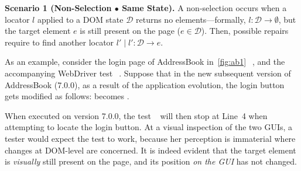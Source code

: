 \noindent
\textbf{Scenario 1 (Non-Selection $\bullet$ Same State).}
A non-selection occurs when a locator $l$ applied to a DOM state $\mathcal{D}$ returns no elements---formally, $l: \mathcal{D} \rightarrow \emptyset$, but the target element $e$ is still present on the page ($e \in \mathcal{D}$).
Then, possible repairs require to find another locator $l' \mid l': \mathcal{D} \rightarrow e$.

As an example, consider the login page of AddressBook in~\autoref{fig:ab1}~\textcircled{}, and the accompanying WebDriver test~\textcircled{}. 
%
Suppose that in the new subsequent version of AddressBook (7.0.0), as a result of the application evolution, 
the login button gets modified as follows:  becomes .

When executed on version 7.0.0, the test~\textcircled{} will then stop at Line~4 when attempting to locate the login button. %
%
At a visual inspection of the two GUIs, a tester would expect the test to work, because her perception is immaterial where changes at DOM-level are concerned. It is indeed evident that the target element is \textit{visually} still present on the page, and its position \textit{on the GUI} has not changed.
 

 
